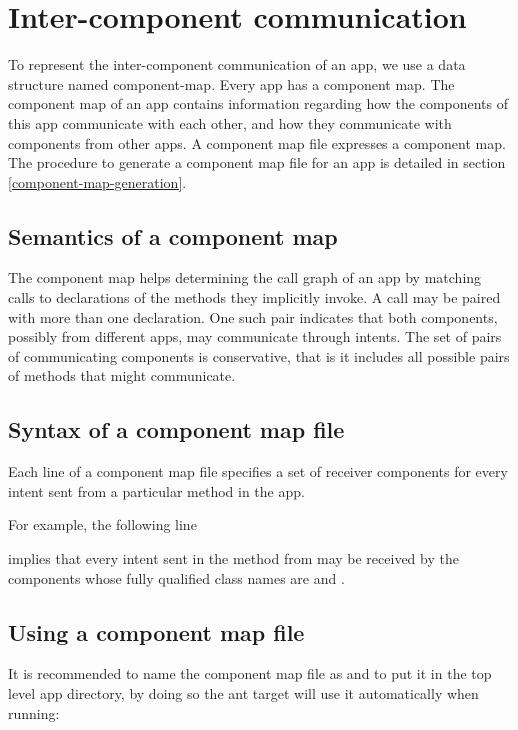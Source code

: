 \section{Inter-component communication\label{component-map}}

To represent the inter-component communication of an app, we use a data
structure named component-map. Every app has a component map. The component map
of an app contains information regarding how the components of this app
communicate with each other, and how they communicate with components from other
apps. A component map file expresses a component map. The procedure to generate
a component map file for an app is detailed in section \ref{component-map-generation}.


\subsection{Semantics of a component map}
The component map helps
determining the call graph of an app by matching \sendIntent{} calls to
declarations of the \onReceive{} methods they implicitly invoke. A \sendIntent{}
call may be paired with more than one \onReceive{} declaration. One such pair
indicates that both components, possibly from different apps, may communicate
through intents. The set of pairs of communicating components is
conservative, that is it includes all possible pairs of methods that might
communicate.

\subsection{Syntax of a component map file}
Each line of a component map file specifies a set of receiver components for 
every intent sent from a particular method in the app.

For example, the following line


\noindent
implies that every intent sent in the method  from 
 may be received by the components whose fully qualified class 
names are  and .

\subsection{Using a component map file}
It is recommended to name the component map file as  and to
put it in the top level app directory, by doing so the ant target will use it
automatically when running:

